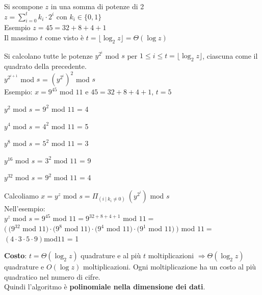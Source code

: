 \documentclass[10pt]{book}
\begin{document}
\begin{list}{}{}
	\item Si scompone $z$ in una somma di potenze di 2\\
	$z = \sum_{i=0}^t k_i\cdot 2^i$ con $k_i\in\{0,1\}$\\
	Esempio $z = 45 = 32 + 8 + 4 + 1$\\
	Il massimo $t$ come visto è $t = \lfloor \log_2 z\rfloor = \Theta(\log z)$
	\item Si calcolano tutte le potenze $y^{2^i}$ mod $s$ per $1\leq i \leq t = \lfloor\log_2 z\rfloor$, ciascuna come il quadrato della precedente.\\
	$y^{2^{i+1}}$ mod $s$ = $\left(y^{2^i}\right)^2$ mod $s$\\
	Esempio: $x = 9^{45}$ mod $11$ e $45 = 32 + 8 + 4 + 1$, $t = 5$
	\begin{list}{}{}
		\item $y^2$ mod $s$ = $9^2$ mod $11$ = 4
		\item $y^4$ mod $s$ = $4^2$ mod $11$ = 5
		\item $y^8$ mod $s$ = $5^2$ mod $11$ = 3
		\item $y^{16}$ mod $s$ = $3^2$ mod $11$ = 9
		\item $y^{32}$ mod $s$ = $9^2$ mod $11$ = 4
	\end{list}
	\item Calcoliamo $x = y^z$ mod $s = \Pi_{(i\:|\:k_i\neq0)}\:(y^{2^i})$ mod $s$\\
	Nell'esempio:\\
	$y^z$ mod $s = 9^{45}$ mod $11 = 9^{32+8+4+1}$ mod $11 =$\\$(\:(9^{32}$ mod $11)\cdot(9^8$ mod $11)\cdot(9^4$ mod $11)\cdot(9^1$ mod $11)\:)$ mod $11 =$\\
	$(4\cdot3\cdot5\cdot9)$mod$11$ = 1
	
\end{list}
\textbf{Costo}: $t = \Theta(\log_2 z)$ quadrature e al più $t$ moltiplicazioni $\Rightarrow \Theta(\log_2 z)$ quadrature e $O(\log z)$ moltiplicazioni. Ogni moltiplicazione ha un costo al più quadratico nel numero di cifre.\\
Quindi l'algoritmo è \textbf{polinomiale nella dimensione dei dati}.
\end{document}
